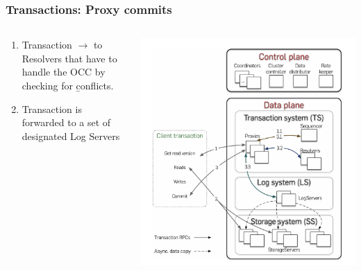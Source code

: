 \begin{frame}
    \frametitle{Transactions: Proxy commits}
    \begin{columns}
        \begin{column}{0.5\textwidth}
            \begin{enumerate}
\item Transaction $\rightarrow$ to Resolvers that have to handle the OCC by checking for \b conflicts.
    \item Transaction is forwarded to a set of designated Log Servers
            \end{enumerate}
        \end{column}
        \begin{column}{0.5\textwidth}
            \centering
            \includegraphics[width=\textwidth]{img/2-Architecture/Architecture and transaction processing.png}
        \end{column}
    \end{columns}
\end{frame}
